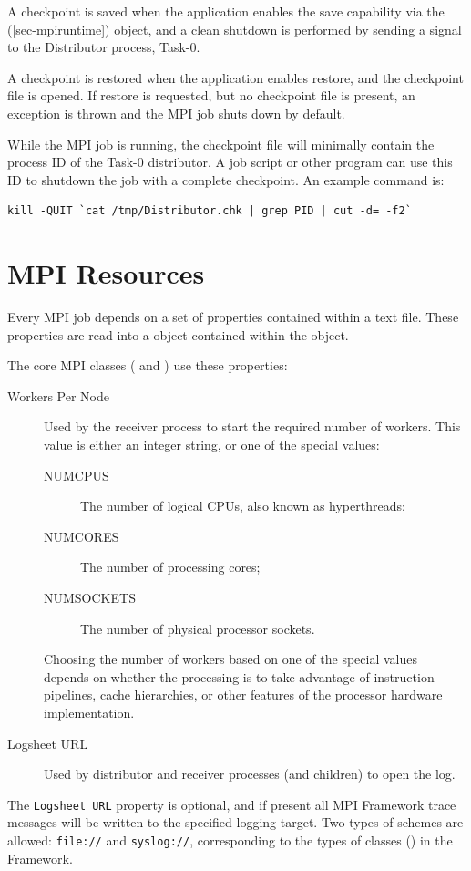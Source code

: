 A checkpoint is saved when the application enables the save capability via
the  (\ref{sec-mpiruntime}) object, and a clean shutdown is
performed by sending a signal to the Distributor process, Task-0.

A checkpoint is restored when the application enables restore, and the
checkpoint file is opened. If restore is requested, but no checkpoint file is
present, an exception is thrown and the MPI job shuts down by default.

While the MPI job is running, the checkpoint file will minimally contain the
process ID of the Task-0 distributor. A job script or other program can use
this ID to shutdown the job with a complete checkpoint. An example command is:
\begin{verbatim}
kill -QUIT `cat /tmp/Distributor.chk | grep PID | cut -d= -f2`
\end{verbatim}

\section{MPI Resources}
\label{sec-mpiresources}
Every MPI job depends on a set of properties contained within a text file.
These properties are read into a  object contained within
the  object.

The core MPI classes ( and ) use these
properties:
\begin{description}
\item[Workers Per Node] Used by the receiver process to start the
required number of workers. This value is either an integer string, or
one of the special values:
\begin{description}
\item[NUMCPUS] The number of logical CPUs, also known as hyperthreads;
\item[NUMCORES] The number of processing cores;
\item[NUMSOCKETS] The number of physical processor sockets.
\end{description}
Choosing the number of workers based on one of the special values depends on
whether the processing is to take advantage of instruction pipelines, cache
hierarchies, or other features of the processor hardware implementation.

\item[Logsheet URL] Used by distributor and receiver processes
(and children) to open the log.
\end{description}
The \verb=Logsheet URL= property is optional, and if present all MPI Framework
trace messages will be written to the specified logging target. Two types of
\URL schemes are allowed: \verb=file://= and \verb=syslog://=, corresponding
to the types of  classes () in the
Framework.

